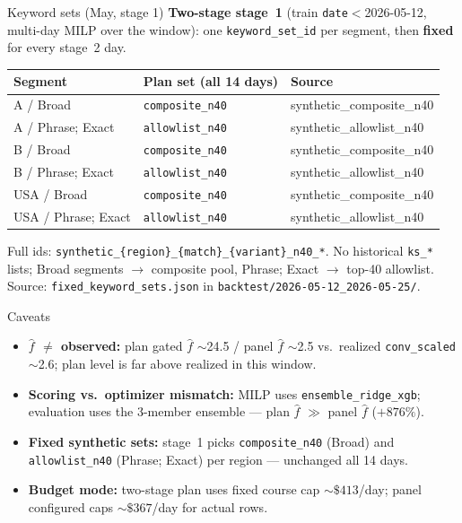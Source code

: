 \documentclass[11pt]{beamer}
\begin{document}
\begin{frame}{Keyword sets (May, stage 1)}
  \footnotesize
  \textbf{Two-stage stage~1} (train \texttt{date}${<}$2026-05-12, multi-day MILP over the window): one \texttt{keyword\_set\_id} per segment, then \textbf{fixed} for every stage~2 day.

  \vspace{0.3em}
  \centering
  \setlength{\tabcolsep}{4pt}
  \renewcommand{\arraystretch}{1.08}
  \begin{tabular}{@{}lll@{}}
    \toprule
    Segment & Plan set (all 14 days) & Source \\
    \midrule
    A / Broad & \texttt{composite\_n40} & synthetic\_composite\_n40 \\
    A / Phrase; Exact & \texttt{allowlist\_n40} & synthetic\_allowlist\_n40 \\
    B / Broad & \texttt{composite\_n40} & synthetic\_composite\_n40 \\
    B / Phrase; Exact & \texttt{allowlist\_n40} & synthetic\_allowlist\_n40 \\
    USA / Broad & \texttt{composite\_n40} & synthetic\_composite\_n40 \\
    USA / Phrase; Exact & \texttt{allowlist\_n40} & synthetic\_allowlist\_n40 \\
    \bottomrule
  \end{tabular}

  \vspace{0.3em}
  \raggedright
  {\scriptsize
  Full ids: \texttt{synthetic\_\{region\}\_\{match\}\_\{variant\}\_n40\_*}.
  No historical \texttt{ks\_*} lists; Broad segments $\rightarrow$ composite pool, Phrase; Exact $\rightarrow$ top-40 allowlist.
  Source: \texttt{fixed\_keyword\_sets.json} in \texttt{backtest/2026-05-12\_2026-05-25/}.}
  \normalsize
\end{frame}

\begin{frame}{Caveats}
  \begin{itemize}
    \item \textbf{$\hat f$ $\neq$ observed:} plan gated $\hat f$ $\sim$24.5 / panel $\hat f$ $\sim$2.5 vs.\ realized \texttt{conv\_scaled} $\sim$2.6; plan level is far above realized in this window.
    \item \textbf{Scoring vs.\ optimizer mismatch:} MILP uses \texttt{ensemble\_ridge\_xgb}; evaluation uses the 3-member ensemble --- plan $\hat f$ $\gg$ panel $\hat f$ ($+876\%$).
    \item \textbf{Fixed synthetic sets:} stage~1 picks \texttt{composite\_n40} (Broad) and \texttt{allowlist\_n40} (Phrase; Exact) per region --- unchanged all 14 days.
    \item \textbf{Budget mode:} two-stage plan uses fixed course cap ${\sim}\$413$/day; panel configured caps ${\sim}\$367$/day for actual rows.
  \end{itemize}
\end{frame}
\end{document}
